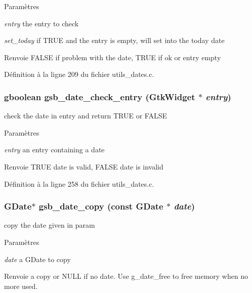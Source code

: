 \begin{DoxyParams}{Paramètres}
\item[{\em entry}]the entry to check \item[{\em set\_\-today}]if TRUE and the entry is empty, will set into the today date\end{DoxyParams}
\begin{DoxyReturn}{Renvoie}
FALSE if problem with the date, TRUE if ok or entry empty 
\end{DoxyReturn}


Définition à la ligne 209 du fichier utils\_\-dates.c.

\subsubsection[{gsb\_\-date\_\-check\_\-entry}]{\setlength{\rightskip}{0pt plus 5cm}gboolean gsb\_\-date\_\-check\_\-entry (GtkWidget $\ast$ {\em entry})}\label{utils__dates_8c_a02184736d75dd242e3c5c3b4a89efd81}
check the date in entry and return TRUE or FALSE


\begin{DoxyParams}{Paramètres}
\item[{\em entry}]an entry containing a date\end{DoxyParams}
\begin{DoxyReturn}{Renvoie}
TRUE date is valid, FALSE date is invalid 
\end{DoxyReturn}


Définition à la ligne 258 du fichier utils\_\-dates.c.

\subsubsection[{gsb\_\-date\_\-copy}]{\setlength{\rightskip}{0pt plus 5cm}GDate$\ast$ gsb\_\-date\_\-copy (const GDate $\ast$ {\em date})}\label{utils__dates_8c_ad688d2e013a4c82fa7e1cb47f64054d4}
copy the date given in param


\begin{DoxyParams}{Paramètres}
\item[{\em date}]a GDate to copy\end{DoxyParams}
\begin{DoxyReturn}{Renvoie}
a copy or NULL if no date. Use g\_\-date\_\-free to free memory when no more used. 
\end{DoxyReturn}


